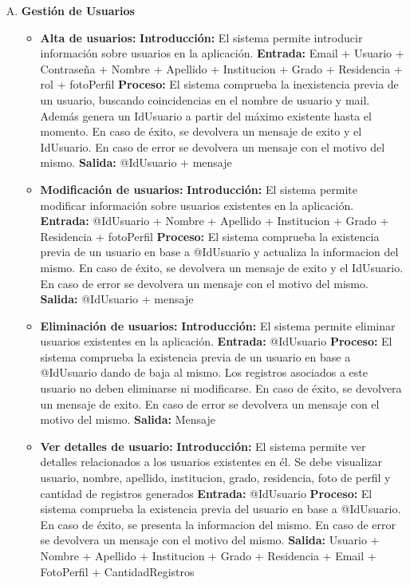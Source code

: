     \begin{enumerate}[A.]
      \item \textbf{Gestión de Usuarios}
        \begin{itemize}  
          \item \textbf{Alta de usuarios:}
            \tab \textbf{Introducción:} El sistema permite introducir información sobre usuarios en la aplicación.
            \tab \textbf{Entrada:} Email + Usuario + Contraseña + Nombre + Apellido + Institucion + Grado + Residencia + rol + fotoPerfil
            \tab \textbf{Proceso:} El sistema comprueba la inexistencia previa de un usuario, buscando coincidencias en el nombre de usuario y mail. Además genera un IdUsuario a partir del máximo existente hasta el momento. En caso de éxito, se devolvera un mensaje de exito y el IdUsuario. En caso de error se devolvera un mensaje con el motivo del mismo.
            \tab \textbf{Salida:} @IdUsuario + mensaje

          \item \textbf{Modificación de usuarios:}
            \tab \textbf{Introducción:} El sistema permite modificar información sobre usuarios existentes en la aplicación.
            \tab \textbf{Entrada:} @IdUsuario + Nombre + Apellido + Institucion + Grado + Residencia + fotoPerfil
            \tab \textbf{Proceso:} El sistema comprueba la existencia previa de un usuario en base a @IdUsuario y actualiza la informacion del mismo. En caso de éxito, se devolvera un mensaje de exito y el IdUsuario. En caso de error se devolvera un mensaje con el motivo del mismo.
            \tab \textbf{Salida:} @IdUsuario + mensaje

          \item \textbf{Eliminación de usuarios:}
            \tab \textbf{Introducción:} El sistema permite eliminar usuarios existentes en la aplicación.
            \tab \textbf{Entrada:} @IdUsuario
            \tab \textbf{Proceso:} El sistema comprueba la existencia previa de un usuario en base a @IdUsuario dando de baja al mismo. Los registros asociados a este usuario no deben eliminarse ni modificarse. En caso de éxito, se devolvera un mensaje de exito. En caso de error se devolvera un mensaje con el motivo del mismo.
            \tab \textbf{Salida:} Mensaje

          \item \textbf{Ver detalles de usuario:}
            \tab \textbf{Introducción:} El sistema permite ver detalles relacionados a los usuarios existentes en él. Se debe visualizar usuario, nombre, apellido, institucion, grado, residencia, foto de perfil y cantidad de registros generados
            \tab \textbf{Entrada:} @IdUsuario
            \tab \textbf{Proceso:} El sistema comprueba la existencia previa del usuario en base a @IdUsuario. En caso de éxito, se presenta la informacion del mismo. En caso de error se devolvera un mensaje con el motivo del mismo.
            \tab \textbf{Salida:} Usuario + Nombre + Apellido + Institucion + Grado + Residencia + Email + FotoPerfil + CantidadRegistros


\end{itemize}
\end{enumerate}
